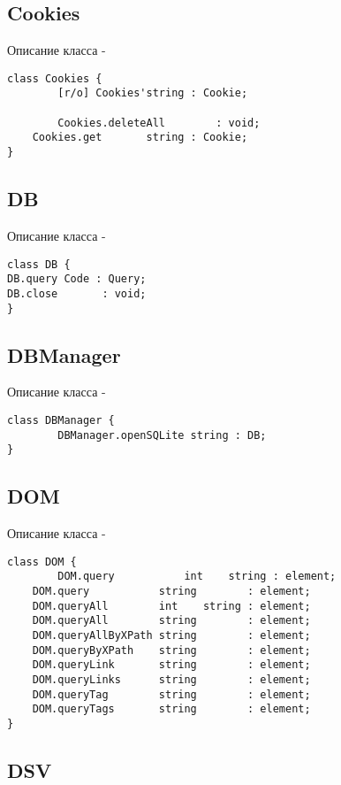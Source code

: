 \subsection{{\color{orange} Cookies}}

\noindent Описание класса  -
\begin{lstlisting}[numbers=none]
class Cookies {
        [r/o] Cookies'string : Cookie;

        Cookies.deleteAll        : void;
	Cookies.get       string : Cookie;
}
\end{lstlisting}

\subsection{{\color{orange} DB}}

\noindent Описание класса  -
\begin{lstlisting}[numbers=none]
class DB {
DB.query Code : Query;
DB.close       : void;
}
\end{lstlisting}

\subsection{{\color{orange} DBManager}}

\noindent Описание класса  -
\begin{lstlisting}[numbers=none]
class DBManager {
        DBManager.openSQLite string : DB;
}
\end{lstlisting}

\subsection{{\color{orange} DOM}}

\noindent Описание класса  -
\begin{lstlisting}[numbers=none]
class DOM {
        DOM.query           int    string : element;
	DOM.query           string        : element;
	DOM.queryAll        int    string : element;
	DOM.queryAll        string        : element;
	DOM.queryAllByXPath string        : element;
	DOM.queryByXPath    string        : element;
	DOM.queryLink       string        : element;
	DOM.queryLinks      string        : element;
	DOM.queryTag        string        : element;
	DOM.queryTags       string        : element;
}
\end{lstlisting}

\subsection{{\color{orange} DSV}}

